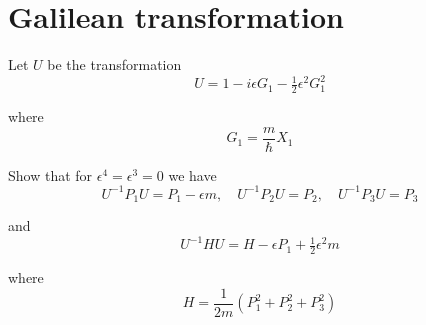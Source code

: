 

\section*{Galilean transformation}

Let $U$ be the transformation
\begin{equation*}
U=1-i\epsilon G_1-\tfrac{1}{2}\epsilon^2G_1^2
\end{equation*}

where
\begin{equation*}
G_1=\frac{m}{\hbar}X_1
\end{equation*}

Show that for $\epsilon^4=\epsilon^3=0$ we have
\begin{equation*}
U^{-1}P_1U=P_1-\epsilon m,\quad U^{-1}P_2U=P_2,\quad U^{-1}P_3U=P_3\tag{1}
\end{equation*}

and
\begin{equation*}
U^{-1}HU=H-\epsilon P_1+\tfrac{1}{2}\epsilon^2m\tag{2}
\end{equation*}

where
\begin{equation*}
H=\frac{1}{2m}\left(P_1^2+P_2^2+P_3^2\right)
\end{equation*}


